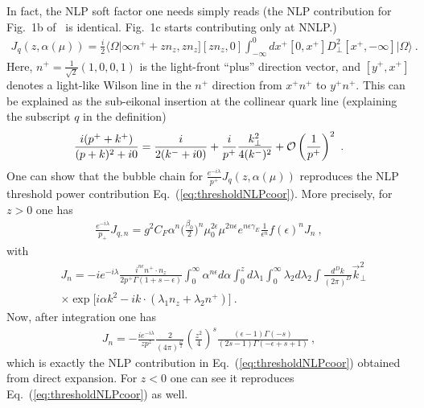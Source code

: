 \documentclass[a4paper,11pt]{article}
\begin{document}
In fact, the NLP soft factor one needs simply reads (the NLP contribution for Fig.~1b of~\cite{Braun:2018brg} is identical. Fig.~1c starts contributing only at NNLP.)
\begin{align}\label{eq:NLPjet}
J_{q}(z,\alpha(\mu))=\frac{i}{2}\big\langle \Omega \big|\infty n^++zn_z, zn_z][zn_z,0]\int_{-\infty}^{0} dx^+[0,x^+]D_\perp^2[x^+,-\infty]\big|\Omega \big\rangle \ .
\end{align}
Here, $n^+=\frac{1}{\sqrt{2}}(1,0,0,1)$ is the light-front ``plus'' direction vector, and  $[y^+,x^+]$ denotes a light-like Wilson line in the $n^+$ direction from $x^+n^+$ to $y^+n^+$. 
This can be explained as the sub-eikonal insertion at the collinear quark line (explaining the subscript $q$ in the definition)
\begin{align}
\frac{i(p^++k^+)}{(p+k)^2+i0}=\frac{i}{2(k^-+i0)}+\frac{i}{p^+}\frac{k_\perp^2}{4(k^-)^2}+{\cal O}\left(\frac{1}{p^+}\right)^2 \ .
\end{align}
One can show that the bubble chain for $\frac{e^{-i\lambda}}{p^+}J_q(z,\alpha(\mu))$ reproduces the NLP threshold power contribution Eq.~(\ref{eq:thresholdNLPcoor}).  More precisely,  for $z>0$ one has
\begin{align}
\frac{e^{-i\lambda}}{p_+}J_{q,n}=g^2C_F\alpha^n\bigg(\frac{\beta_0}{2}\bigg)^n\mu_0^{2\epsilon}\mu^{2n\epsilon}e^{n\epsilon \gamma_E}\frac{1}{\epsilon^n}f(\epsilon)^n J_n \ ,
\end{align}
with 
\begin{align}
&J_n=-ie^{-i\lambda}\frac{i^{n\epsilon}n^+\cdot n_z}{2p^+\Gamma(1+s-\epsilon)}\int_{0}^{\infty}\alpha^{n\epsilon}d\alpha\int_{0}^{z}d\lambda_1\int_{0}^{\infty}\lambda_2d\lambda_2\int \frac{d^Dk}{(2\pi)^D}\vec{k}_\perp^2 \nonumber \\ 
& \times \exp \bigg[i\alpha k^2-ik\cdot(\lambda_1 n_z+\lambda_2n^+)\bigg] \ .
\end{align}
Now, after integration one has
\begin{align}
J_n=-\frac{ie^{-i\lambda}}{zp^z}\frac{2}{(4\pi)^{\frac{D}{2}}}\left(\frac{z^2}{4}\right)^s\frac{(\epsilon-1)\Gamma (-s)}{(2 s-1) \Gamma (-\epsilon+s+1)} \ ,
\end{align}
which is exactly the NLP contribution in Eq.~(\ref{eq:thresholdNLPcoor}) obtained from direct expansion. For $z<0$ one can see it reproduces Eq.~(\ref{eq:thresholdNLPcoor}) as well. 
\end{document}
